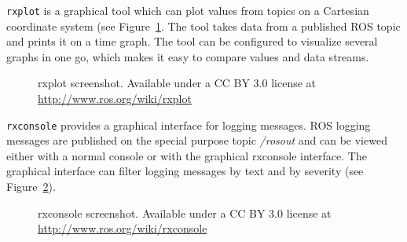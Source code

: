 \texttt{rxplot} is a graphical tool which can plot values from topics on a Cartesian coordinate system (see Figure~\ref{rxplot_screenshot}. The tool takes data from a published ROS topic and prints it on a time graph. The tool can be configured to visualize several graphs in one go, which makes it easy to compare values and data streams.

\begin{figure}[h]
  \centering
  \caption{rxplot screenshot. Available under a CC BY 3.0 license at \url{http://www.ros.org/wiki/rxplot}}
  \label{rxplot_screenshot}
\end{figure}

\texttt{rxconsole} provides a graphical interface for logging messages. ROS logging messages are published on the special purpose topic \emph{/rosout} and can be viewed either with a normal console or with the graphical rxconsole interface. The graphical interface can filter logging messages by text and by severity (see Figure~\ref{rxconsole_screenshot}).\enlargethispage{-2em}

\begin{figure}[p]
  \centering
  \caption{rxconsole screenshot. Available under a CC BY 3.0 license at \url{http://www.ros.org/wiki/rxconsole}}
  \label{rxconsole_screenshot}
\end{figure}


